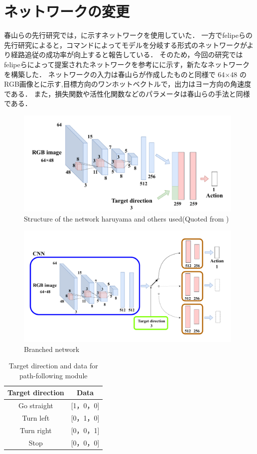 \section{ネットワークの変更}
春山らの先行研究では，に示すネットワークを使用していた．
一方でfelipeらの先行研究によると，コマンドによってモデルを分岐する形式のネットワークがより経路追従の成功率が向上すると報告している．
そのため，今回の研究ではfelipeらによって提案されたネットワークを参考にに示す，新たなネットワークを構築した．
ネットワークの入力は春山らが作成したものと同様で 64×48 の RGB画像とに示す,目標方向のワンホットベクトルで，出力はヨー方向の角速度である．
また，損失関数や活性化関数などのパラメータは春山らの手法と同様である．

\begin{figure}[htbp]
  \centering
  \includegraphics[width=110mm]{images/pdf/haruyama/net.pdf}
  \caption[Structure of the network haruyama and others used]{Structure of the network haruyama and others used(Quoted from \cite{fujiwara2023})}
  \label{fig:haruyama_net}
\end{figure}

\begin{figure}[htbp]
  \centering
   \includegraphics[width=110mm]{images/pdf/ishiguro/branched.pdf}
   \caption{Branched network}
   \label{fig:branched}
\end{figure}

\begin{table}[htbp]
  \centering
  \caption{Target direction and data for path-following module}\label{tab:cmd_dir}
  \begin{tabular}{|c|c|}
  \hline
  Target direction & Data        \\
  \hline
  Go straight   & {[}1，0，0{]} \\
  Turn left   & {[}0，1，0{]} \\
  Turn right   & {[}0，0，1{]} \\
  Stop   & {[}0，0，0{]}\\
  \hline
  \end{tabular}
\end{table}

\clearpage